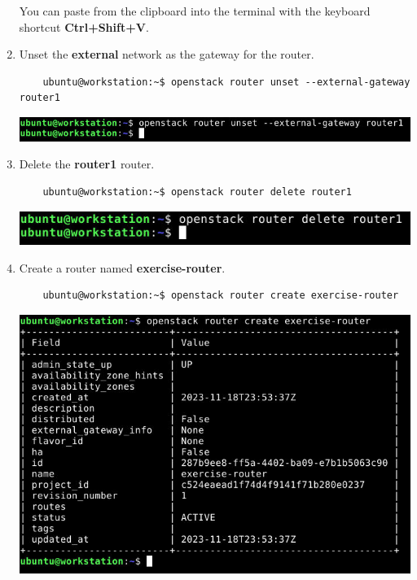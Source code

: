 \documentclass[letterpaper, 12pt]{article}
\begin{document}
\begin{enumerate}
    \begin{tipbox}
        You can paste from the clipboard into the terminal with the keyboard shortcut \textbf{Ctrl+Shift+V}.
    \end{tipbox}

    \item Unset the \textbf{external} network as the gateway for the router.
    \begin{lstlisting}
    ubuntu@workstation:~$ openstack router unset --external-gateway router1
    \end{lstlisting}

    \begin{center}
        \includegraphics[width=\linewidth]{images/part2/step11.png}
    \end{center}

    \item Delete the \textbf{router1} router.
    \begin{lstlisting}
    ubuntu@workstation:~$ openstack router delete router1
    \end{lstlisting}

    \begin{center}
        \includegraphics[width=\linewidth]{images/part2/step12.png}
    \end{center}

    \item Create a router named \textbf{exercise-router}.
    \begin{lstlisting}
    ubuntu@workstation:~$ openstack router create exercise-router
    \end{lstlisting}

    \begin{center}
        \includegraphics[width=\linewidth]{images/part2/step13.png}
    \end{center}


\end{enumerate}
\end{document}
